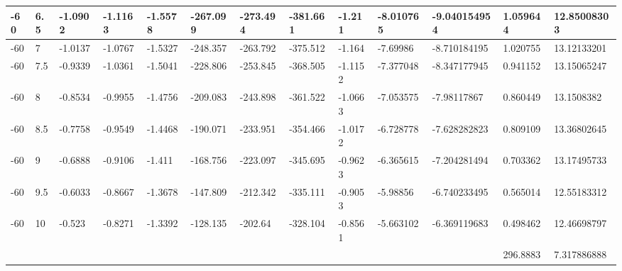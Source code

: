 \begin{longtable}{|l|l|l|l|l|l|l|l|l|l|l|l|l|}
-60   & 6.5   & -1.0902 & -1.1163 & -1.5578 & -267.099 & -273.494 & -381.661 & -1.211   & -8.010765   & -9.040154954   & 1.059644                 & 12.85008303 \\ \hline
-60   & 7     & -1.0137 & -1.0767 & -1.5327 & -248.357 & -263.792 & -375.512 & -1.164   & -7.69986    & -8.710184195   & 1.020755                 & 13.12133201 \\ \hline
-60   & 7.5   & -0.9339 & -1.0361 & -1.5041 & -228.806 & -253.845 & -368.505 & -1.1152  & -7.377048   & -8.347177945   & 0.941152                 & 13.15065247 \\ \hline
-60   & 8     & -0.8534 & -0.9955 & -1.4756 & -209.083 & -243.898 & -361.522 & -1.0663  & -7.053575   & -7.98117867    & 0.860449                 & 13.1508382  \\ \hline
-60   & 8.5   & -0.7758 & -0.9549 & -1.4468 & -190.071 & -233.951 & -354.466 & -1.0172  & -6.728778   & -7.628282823   & 0.809109                 & 13.36802645 \\ \hline
-60   & 9     & -0.6888 & -0.9106 & -1.411  & -168.756 & -223.097 & -345.695 & -0.9623  & -6.365615   & -7.204281494   & 0.703362                 & 13.17495733 \\ \hline
-60   & 9.5   & -0.6033 & -0.8667 & -1.3678 & -147.809 & -212.342 & -335.111 & -0.9053  & -5.98856    & -6.740233495   & 0.565014                 & 12.55183312 \\ \hline
-60   & 10    & -0.523  & -0.8271 & -1.3392 & -128.135 & -202.64  & -328.104 & -0.8561  & -5.663102   & -6.369119683   & 0.498462                 & 12.46698797 \\ \hline
      &       &         &         &         &          &          &          &          &             &                & 296.8883                 & 7.317886888 \\ \hline
\end{longtable}
